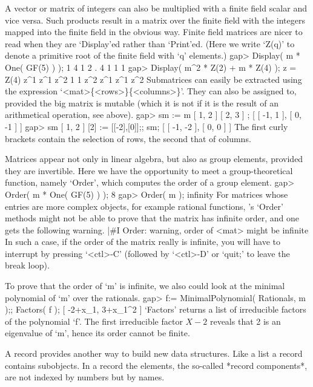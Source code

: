 A vector or matrix of integers can also be multiplied
with a finite field scalar and vice versa.
Such products result in a matrix over the finite field with the integers
mapped into the finite field in the obvious way.
Finite field matrices are nicer to read when they are `Display'ed rather
than `Print'ed.
(Here  we write `Z(q)' to denote a  primitive root of the finite field
with `q' elements.)
\beginexample
gap> Display( m * One( GF(5) ) );
 1 4 1
 2 . 4
 1 1 1
gap> Display( m^2 * Z(2) + m * Z(4) );
z = Z(4)
 z^1 z^1 z^2
   1   1 z^2
 z^1 z^1 z^2
\endexample
Submatrices    can  easily     be    extracted  using    the   expression
`<mat>\{<rows>\}\{<columns>\}'. They   can also be  assigned to, provided
the big matrix  is mutable (which  it is not if it  is  the result of  an
arithmetical operation, see above).
\beginexample
gap> sm := m{ [ 1, 2 ] }{ [ 2, 3 ] };
[ [ -1, 1 ], [ 0, -1 ] ]
gap> sm{ [ 1, 2 ] }{ [2] } := [[-2],[0]];;  sm;
[ [ -1, -2 ], [ 0, 0 ] ]
\endexample
The first curly brackets contain the selection of rows,
the second that of columns.

Matrices appear not only in linear algebra, but also as group elements,
provided they are invertible.
Here we have the opportunity to meet a group-theoretical function,
namely `Order', which computes the order of a group element.
\beginexample
gap> Order( m * One( GF(5) ) );
8
gap> Order( m );
infinity
\endexample
For matrices whose entries are more complex objects, for example rational
functions, {\GAP}'s `Order' methods might not be able to prove that the
matrix has infinite order, and one gets the following warning.
\begintt
|#I  Order: warning, order of <mat> might be infinite
\endtt
In such a case, if the order of the matrix really is infinite, you will
have to interrupt {\GAP} by  pressing `<ctl>-C' (followed by `<ctl>-D' or
`quit;'  to leave the   break loop).

To prove that the order of `m' is infinite, we also could look at the
minimal polynomial of `m' over the rationals.
\beginexample
gap> f:= MinimalPolynomial( Rationals, m );;  Factors( f );
[ -2+x_1, 3+x_1^2 ]
\endexample
`Factors'  returns a list of  irreducible factors  of the polynomial `f'.
The first  irreducible factor $X-2$ reveals   that 2 is an  eigenvalue of
`m', hence its order cannot be finite.



A record provides another way to  build new data structures.  Like a list
a record contains subobjects.
In a record the elements, the so-called *record components*,
are not indexed by numbers but by names.

